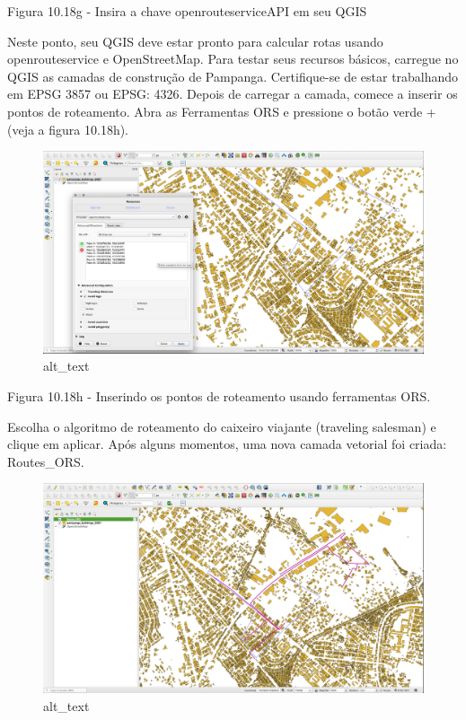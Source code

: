 \documentclass[
]{book}
\begin{document}
Figura 10.18g - Insira a chave openrouteserviceAPI em seu QGIS

Neste ponto, seu QGIS deve estar pronto para calcular rotas usando openrouteservice e OpenStreetMap. Para testar seus recursos básicos, carregue no QGIS as camadas de construção de Pampanga. Certifique-se de estar trabalhando em EPSG 3857 ou EPSG: 4326. Depois de carregar a camada, comece a inserir os pontos de roteamento. Abra as Ferramentas ORS e pressione o botão verde + (veja a figura 10.18h).

\begin{figure}
\centering
\includegraphics{media/modulo10/fig1018_h.png}
\caption{alt\_text}
\end{figure}

Figura 10.18h - Inserindo os pontos de roteamento usando ferramentas ORS.

Escolha o algoritmo de roteamento do caixeiro viajante (traveling salesman) e clique em aplicar. Após alguns momentos, uma nova camada vetorial foi criada: Routes\_ORS.

\begin{figure}
\centering
\includegraphics{media/modulo10/fig1018_i.png}
\caption{alt\_text}
\end{figure}
\end{document}
